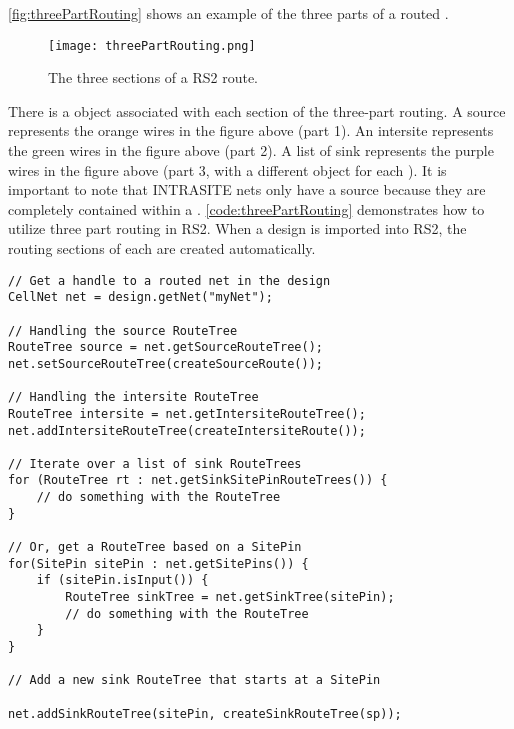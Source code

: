 \noindent \autoref{fig:threePartRouting} shows an example of the three parts of
a routed \cellnet.

\begin{figure}[H]
\centering
\texttt{[image: threePartRouting.png]}
\caption{The three sections of a RS2 route.}
\label{fig:threePartRouting}
\end{figure}

\noindent 
There is a \routeTree object associated with each section of the
three-part routing. A source \routeTree represents the orange wires in the
figure above (part 1). An intersite \routeTree represents the green wires in the
figure above (part 2). A list of sink \routeTrees represents the purple
wires in the figure above (part 3, with a different \routeTree object for each
\site). It is important to note that INTRASITE nets only have a source
\routeTree because they are completely contained within a \site.
\autoref{code:threePartRouting} demonstrates how to utilize three part routing
in RS2. When a design is imported into RS2, the routing sections
of each \cellnet are created automatically.

\begin{lstlisting}[caption=Three-part routing in RS2,
label=code:threePartRouting]
// Get a handle to a routed net in the design 
CellNet net = design.getNet("myNet");

// Handling the source RouteTree
RouteTree source = net.getSourceRouteTree();
net.setSourceRouteTree(createSourceRoute());

// Handling the intersite RouteTree
RouteTree intersite = net.getIntersiteRouteTree();
net.addIntersiteRouteTree(createIntersiteRoute());

// Iterate over a list of sink RouteTrees
for (RouteTree rt : net.getSinkSitePinRouteTrees()) {
	// do something with the RouteTree
}

// Or, get a RouteTree based on a SitePin
for(SitePin sitePin : net.getSitePins()) {
	if (sitePin.isInput()) {
		RouteTree sinkTree = net.getSinkTree(sitePin);
		// do something with the RouteTree
	}
}

// Add a new sink RouteTree that starts at a SitePin

net.addSinkRouteTree(sitePin, createSinkRouteTree(sp));
\end{lstlisting}

